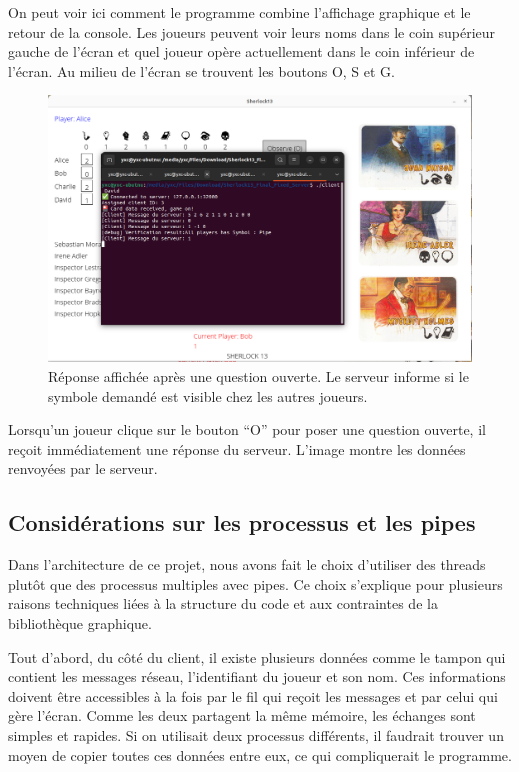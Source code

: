 \documentclass{article}
\begin{document}
On peut voir ici comment le programme combine l'affichage graphique et le retour de la console. 
Les joueurs peuvent voir leurs noms dans le coin supérieur gauche de l'écran et quel joueur opère actuellement dans le coin inférieur de l'écran. 
Au milieu de l'écran se trouvent les boutons O, S et G.

\begin{figure}[H]
    \centering
    \includegraphics[width=0.9\linewidth]{images/message_returned.png}
    \caption{Réponse affichée après une question ouverte. Le serveur informe si le symbole demandé est visible chez les autres joueurs.}
\end{figure}
    
Lorsqu'un joueur clique sur le bouton “O” pour poser une question ouverte, il reçoit immédiatement une réponse du serveur. 
L'image montre les données renvoyées par le serveur.
    
\subsection{Considérations sur les processus et les pipes}

Dans l'architecture de ce projet, nous avons fait le choix d'utiliser des threads plutôt que des processus multiples avec pipes. 
Ce choix s'explique pour plusieurs raisons techniques liées à la structure du code et aux contraintes de la bibliothèque graphique.

Tout d'abord, du côté du client, il existe plusieurs données comme le tampon qui contient les messages réseau, 
l'identifiant du joueur et son nom. Ces informations doivent être accessibles à la fois par le fil qui reçoit les messages et par celui qui gère l'écran. 
Comme les deux partagent la même mémoire, les échanges sont simples et rapides. Si on utilisait deux processus différents, il faudrait trouver un moyen de copier toutes ces données entre eux, ce qui compliquerait le programme.
\end{document}
